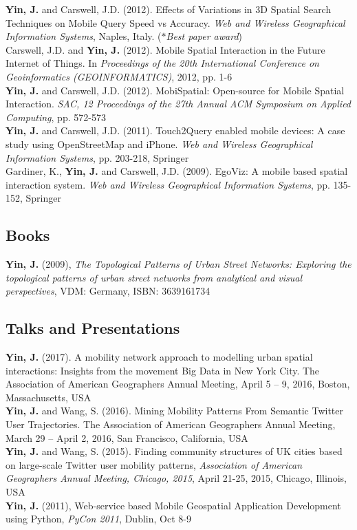 \documentclass[11pt, a4paper]{article}
\newcommand{\years}[1]{\marginnote{\scriptsize #1}}
\begin{document}
\years{2012}\textbf{Yin, J.} and Carswell, J.D. (2012). Effects of Variations in 3D Spatial Search Techniques on Mobile Query Speed vs Accuracy. \emph{Web and Wireless Geographical Information Systems}, Naples, Italy. (\emph{$*$Best paper award})\\
\years{2012}Carswell, J.D. and \textbf{Yin, J.} (2012). Mobile Spatial Interaction in the Future Internet of Things. In \emph{Proceedings of the 20th International Conference on Geoinformatics (GEOINFORMATICS)}, 2012, pp. 1-6\\
\years{2012}\textbf{Yin, J.} and Carswell, J.D. (2012). MobiSpatial: Open-source for Mobile Spatial Interaction. \emph{SAC, 12 Proceedings of the 27th Annual ACM Symposium on Applied Computing}, pp. 572-573\\
\years{2012}\textbf{Yin, J.} and Carswell, J.D. (2011). Touch2Query enabled mobile devices: A case study using OpenStreetMap and iPhone. \emph{Web and Wireless Geographical Information Systems}, pp. 203-218, Springer\\
\years{2009} Gardiner, K., \textbf{Yin, J.} and Carswell, J.D. (2009). EgoViz: A mobile based spatial interaction system. \emph{Web and Wireless Geographical Information Systems}, pp. 135-152, Springer

\subsection*{Books}
\years{2009} \textbf{Yin, J.} (2009), \emph{The Topological Patterns of Urban Street Networks: Exploring the topological patterns of urban street networks from analytical and visual perspectives}, VDM: Germany, ISBN: 3639161734

\subsection*{Talks and Presentations}
\years{2017}\textbf{Yin, J.} (2017). A mobility network approach to modelling urban spatial interactions: Insights from the movement Big Data in New York City. The Association of American Geographers Annual Meeting, April 5 – 9, 2016, Boston, Massachusetts, USA\\
\years{2016}\textbf{Yin, J.} and Wang, S. (2016). Mining Mobility Patterns From Semantic Twitter User Trajectories. The Association of American Geographers Annual Meeting, March 29 – April 2, 2016, San Francisco, California, USA\\
\years{2015}\textbf{Yin, J.} and Wang, S. (2015). Finding community structures of UK cities based on large-scale Twitter user mobility patterns, \textit{Association of American Geographers Annual Meeting, Chicago, 2015}, April 21-25, 2015, Chicago, Illinois, USA\\
\years{2011} \textbf{Yin, J.} (2011), Web-service based Mobile Geospatial Application Development using Python, \textit{PyCon 2011}, Dublin, Oct 8-9
\end{document}
